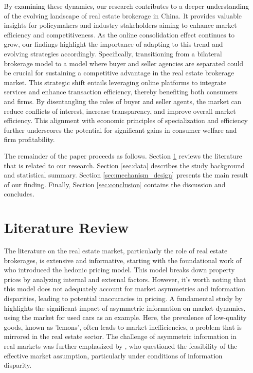 \documentclass[11pt]{article}
\begin{document}
By examining these dynamics, our research contributes to a deeper understanding of the evolving landscape of real estate brokerage in China. It provides valuable insights for policymakers and industry stakeholders aiming to enhance market efficiency and competitiveness. As the online consolidation effect continues to grow, our findings highlight the importance of adapting to this trend and evolving strategies accordingly. Specifically, transitioning from a bilateral brokerage model to a model where buyer and seller agencies are separated could be crucial for sustaining a competitive advantage in the real estate brokerage market. This strategic shift entails leveraging online platforms to integrate services and enhance transaction efficiency, thereby benefiting both consumers and firms. By disentangling the roles of buyer and seller agents, the market can reduce conflicts of interest, increase transparency, and improve overall market efficiency. This alignment with economic principles of specialization and efficiency further underscores the potential for significant gains in consumer welfare and firm profitability.

The remainder of the paper proceeds as follows. Section \ref{sec:literature_review} reviews the literature that is related to our research. Section \ref{sec:data} describes the study background and statistical summary. Section \ref{sec:mechanism_design} presents the main result of our finding. Finally, Section \ref{sec:conclusion} contains the discussion and concludes.

\section{Literature Review} \label{sec:literature_review}

The literature on the real estate market, particularly the role of real estate brokerages, is extensive and informative, starting with the foundational work of \citet{Rosen_hedonic} who introduced the hedonic pricing model. This model breaks down property prices by analyzing internal and external factors. However, it's worth noting that this model does not adequately account for market asymmetries and information disparities, leading to potential inaccuracies in pricing. A fundamental study by \citep{Akerlof_1970} highlights the significant impact of asymmetric information on market dynamics, using the market for used cars as an example. Here, the prevalence of low-quality goods, known as 'lemons', often leads to market inefficiencies, a problem that is mirrored in the real estate sector. The challenge of asymmetric information in real markets was further emphasized by \citet{grossman_impossibility_1980}, who questioned the feasibility of the effective market assumption, particularly under conditions of information disparity.
\end{document}
